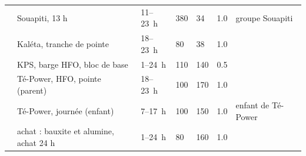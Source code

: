 \begin{longtable}{p{1.0cm}p{5.4cm}p{1.6cm}p{1.5cm}p{1.7cm}p{0.9cm}p{2.7cm}}
 & Souapiti, 13 h & 11--23~h & 380 & 34 & 1.0 & groupe Souapiti \\ \rowsep
 & Kaléta, tranche de pointe & 18--23~h & 80 & 38 & 1.0 &  \\ \rowsep
 & KPS, barge HFO, bloc de base & 1--24~h & 110 & 140 & 0.5 &  \\ \rowsep
 & Té-Power, HFO, pointe (parent) & 18--23~h & 100 & 170 & 1.0 &  \\ \rowsep
 & Té-Power, journée (enfant) & 7--17~h & 100 & 150 & 1.0 & enfant de Té-Power \\ \rowsep
 & achat : bauxite et alumine, achat 24 h & 1--24~h & 80 & 160 & 1.0 &  \\
\end{longtable}
